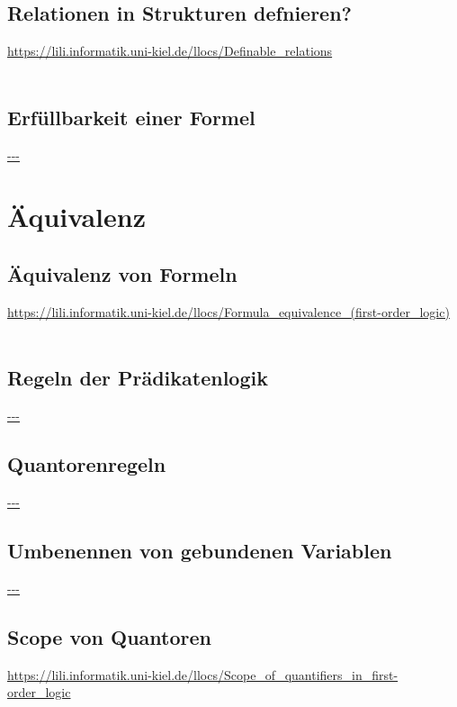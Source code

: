 \documentclass[twocolumn]{article}
\begin{document}
    \subsection{Relationen in Strukturen defnieren?}
    \url{https://lili.informatik.uni-kiel.de/llocs/Definable_relations}\\\\

    \subsection{Erfüllbarkeit einer Formel}
    \url{---}\\

    \section{Äquivalenz}

    \subsection{Äquivalenz von Formeln}
    \url{https://lili.informatik.uni-kiel.de/llocs/Formula_equivalence_(first-order_logic)}\\\\

    \subsection{Regeln der Prädikatenlogik}
    \url{---}\\

    \subsection{Quantorenregeln}
    \url{---}\\

    \subsection{Umbenennen von gebundenen Variablen}
    \url{---}\\

    \subsection{Scope von Quantoren}
    \url{https://lili.informatik.uni-kiel.de/llocs/Scope_of_quantifiers_in_first-order_logic}\\\\
\end{document}
